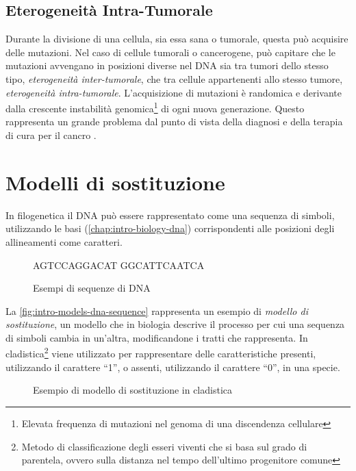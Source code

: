 \subsection{Eterogeneità Intra-Tumorale}
\label{chap:intro-biology-heterogeneity}
Durante la divisione di una cellula, sia essa sana o tumorale, questa può acquisire delle mutazioni. Nel caso di cellule tumorali o cancerogene, può capitare che le mutazioni avvengano in posizioni diverse nel DNA sia tra tumori dello stesso tipo, \textit{eterogeneità inter-tumorale}, che tra cellule appartenenti allo stesso tumore, \textit{eterogeneità intra-tumorale}. L'acquisizione di mutazioni è randomica e derivante dalla crescente instabilità genomica\footnote{Elevata frequenza di mutazioni nel genoma di una discendenza cellulare} di ogni nuova generazione. Questo rappresenta un grande problema dal punto di vista della diagnosi e della terapia di cura per il cancro \cite{intratumoral}.

\section{Modelli di sostituzione}
\label{chap:intro-models}
In filogenetica il DNA può essere rappresentato come una sequenza di simboli, utilizzando le basi (\autoref{chap:intro-biology-dna}) corrispondenti alle posizioni degli allineamenti come caratteri.

\begin{figure}[h]
    \centering
    AGTCCAGGACAT \qquad GGCATTCAATCA
    \caption{Esempi di sequenze di DNA}
    \label{fig:intro-models-dna-sequence}
\end{figure}

La \autoref{fig:intro-models-dna-sequence} rappresenta un esempio di \textit{modello di sostituzione}, un modello che in biologia descrive il processo per cui una sequenza di simboli cambia in un'altra, modificandone i tratti che rappresenta. In cladistica\footnote{Metodo di classificazione degli esseri viventi che si basa sul grado di parentela, ovvero sulla distanza nel tempo dell'ultimo progenitore comune} viene utilizzato per rappresentare delle caratteristiche presenti, utilizzando il carattere ``1'', o assenti, utilizzando il carattere ``0'', in una specie.

\begin{figure}[h]
     
    \caption{Esempio di modello di sostituzione in cladistica}
    \label{fig:intro-models-cladistica-sequence}
\end{figure}

